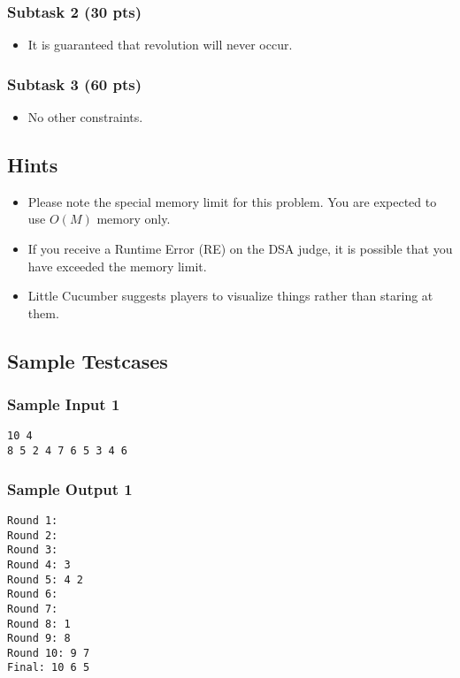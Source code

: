 \subsubsection{Subtask 2 (30 pts)}\label{subtask-2}

\begin{itemize}
\tightlist
\item It is guaranteed that revolution will never occur. 
\end{itemize}

\subsubsection{Subtask 3 (60 pts)}\label{subtask-3}

\begin{itemize}
\tightlist
\item No other constraints.
\end{itemize}

\subsection{Hints}
\begin{itemize}
    \item Please note the special memory limit for this problem. You are expected to use $O(M)$ memory only.
    \item If you receive a Runtime Error (RE) on the DSA judge, it is possible that you have exceeded the memory limit.
    \item Little Cucumber suggests players to visualize things rather than staring at them.
\end{itemize}

\newpage

\subsection{Sample Testcases}

\subsubsection{Sample Input 1}\label{sample-input-1}
\begin{verbatim}
10 4
8 5 2 4 7 6 5 3 4 6
\end{verbatim}

\subsubsection{Sample Output 1}\label{sample-output-1}
\begin{verbatim}
Round 1:
Round 2:
Round 3:
Round 4: 3
Round 5: 4 2
Round 6:
Round 7:
Round 8: 1
Round 9: 8
Round 10: 9 7
Final: 10 6 5
\end{verbatim}

